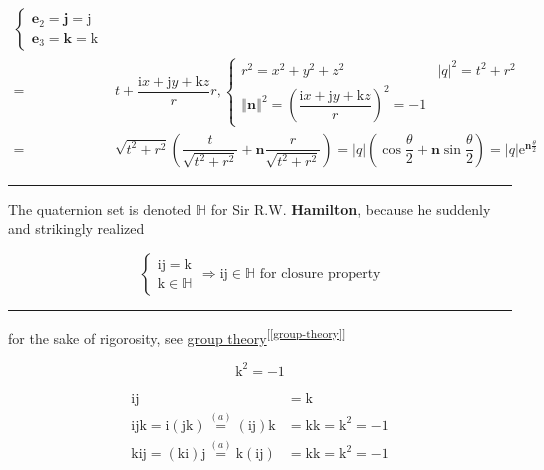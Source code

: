 \documentclass[
]{book}
\theoremstyle{definition}
\theoremstyle{definition}
\theoremstyle{definition}
\theoremstyle{definition}
\theoremstyle{remark}
\begin{document}
\[\begin{aligned}
\begin{cases}
\boldsymbol{e}_{{\scriptscriptstyle 2}}=\boldsymbol{j}=\mathrm{j}\\
\boldsymbol{e}_{{\scriptscriptstyle 3}}=\boldsymbol{k}=\mathrm{k}
\end{cases}\\
= & t+\dfrac{\mathrm{i}x+\mathrm{j}y+\mathrm{k}z}{r}r,\begin{cases}
r^{2}=x^{2}+y^{2}+z^{2} & \left|q\right|^{2}=t^{2}+r^{2}\\
\left\Vert \boldsymbol{n}\right\Vert ^{2}=\left(\dfrac{\mathrm{i}x+\mathrm{j}y+\mathrm{k}z}{r}\right)^{2}=-1
\end{cases}\\
= & \sqrt{t^{2}+r^{2}}\left(\dfrac{t}{\sqrt{t^{2}+r^{2}}}+\boldsymbol{n}\dfrac{r}{\sqrt{t^{2}+r^{2}}}\right)=\left|q\right|\left(\cos\dfrac{\theta}{2}+\boldsymbol{n}\sin\dfrac{\theta}{2}\right)=\left|q\right|\mathrm{e}^{\boldsymbol{n}\frac{\theta}{2}}
\end{aligned}
\]

\begin{center}\rule{0.5\linewidth}{0.5pt}\end{center}

The quaternion set is denoted \(\mathbb{H}\) for Sir R.W. \textbf{Hamilton}, because he suddenly and strikingly realized

\[
\begin{cases}
\mathrm{i}\mathrm{j}=\mathrm{k}\\
\mathrm{k}\in\mathbb{H}
\end{cases}\Rightarrow\mathrm{i}\mathrm{j}\in\mathbb{H}\text{ for closure property}
\]

\begin{center}\rule{0.5\linewidth}{0.5pt}\end{center}

for the sake of rigorosity, see \protect\hyperlink{group-theory}{group theory}\textsuperscript{{[}\ref{group-theory}{]}}

\[
\mathrm{k}^{2}=-1
\]

\[
\begin{aligned}
\mathrm{i}\mathrm{j} & =\mathrm{k}\\
\mathrm{i}\mathrm{j}\mathrm{k}=\mathrm{i}\left(\mathrm{j}\mathrm{k}\right)\overset{\left(a\right)}{=}\left(\mathrm{i}\mathrm{j}\right)\mathrm{k} & =\mathrm{k}\mathrm{k}=\mathrm{k}^{2}=-1\\
\mathrm{k}\mathrm{i}\mathrm{j}=\left(\mathrm{k}\mathrm{i}\right)\mathrm{j}\overset{\left(a\right)}{=}\mathrm{k}\left(\mathrm{i}\mathrm{j}\right) & =\mathrm{k}\mathrm{k}=\mathrm{k}^{2}=-1
\end{aligned}
\]
\end{document}
